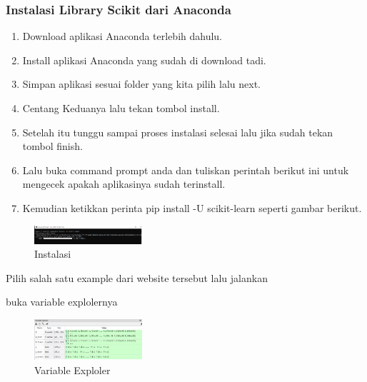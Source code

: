             \subsubsection{Instalasi Library Scikit dari Anaconda}
            \begin{enumerate}
                \item Download aplikasi Anaconda terlebih dahulu. 
                \item Install aplikasi Anaconda yang sudah di download tadi. 
                \item Simpan aplikasi sesuai folder yang kita pilih lalu next. 
                \item Centang Keduanya lalu tekan tombol install. 
                \item Setelah itu tunggu sampai proses instalasi selesai lalu jika sudah tekan tombol finish. 
                \item Lalu buka command prompt anda dan tuliskan perintah berikut ini untuk mengecek apakah aplikasinya sudah   terinstall. 
                \item Kemudian ketikkan perinta pip install -U scikit-learn seperti gambar berikut. 
            \end{enumerate}
             \begin{figure}[H]
                \includegraphics[width=4cm]{figures/1174039/chapter1/1.png}
                \centering
                \caption{Instalasi}
            \end{figure}
            \item Pilih salah satu example dari website tersebut lalu jalankan \hfill \break 
                \item buka variable explolernya
                \begin{figure}[H]
                    \includegraphics[width=4cm]{figures/1174039/chapter1/2.png}
                    \centering
                    \caption{Variable Exploler}
                \end{figure}

